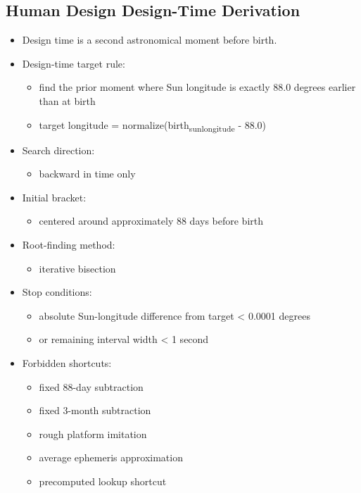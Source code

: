 \documentclass[11pt]{article}
\begin{document}
\subsection{Human Design Design-Time Derivation}
\label{sec:org668f1b0}
\begin{itemize}
\item Design time is a second astronomical moment before birth.
\item Design-time target rule:
\begin{itemize}
\item find the prior moment where Sun longitude is exactly 88.0 degrees earlier than at birth
\item target longitude = normalize(birth\textsubscript{sun}\textsubscript{longitude} - 88.0)
\end{itemize}
\item Search direction:
\begin{itemize}
\item backward in time only
\end{itemize}
\item Initial bracket:
\begin{itemize}
\item centered around approximately 88 days before birth
\end{itemize}
\item Root-finding method:
\begin{itemize}
\item iterative bisection
\end{itemize}
\item Stop conditions:
\begin{itemize}
\item absolute Sun-longitude difference from target < 0.0001 degrees
\item or remaining interval width < 1 second
\end{itemize}
\item Forbidden shortcuts:
\begin{itemize}
\item fixed 88-day subtraction
\item fixed 3-month subtraction
\item rough platform imitation
\item average ephemeris approximation
\item precomputed lookup shortcut
\end{itemize}
\end{itemize}
\end{document}
